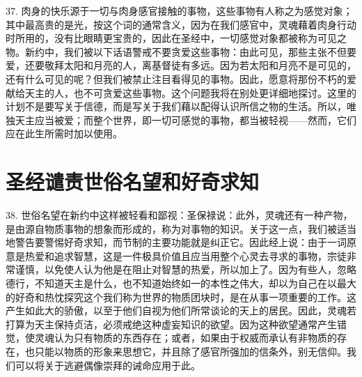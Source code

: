 37. 肉身的快乐源于一切与肉身感官接触的事物，这些事物有人称之为感觉对象；其中最高贵的是光，按这个词的通常含义，因为在我们感官中，灵魂藉着肉身行动时所用的，没有比眼睛更宝贵的，因此在圣经中，一切感觉对象都被称为可见之物。新约中，我们被以下话语警戒不要贪爱这些事物：由此可见，那些主张不但要爱，还要敬拜太阳和月亮的人，离基督徒有多远。因为若太阳和月亮不是可见的，还有什么可见的呢？但我们被禁止注目看得见的事物。因此，愿意将那份不朽的爱献给天主的人，也不可贪爱这些事物。这个问题我将在别处更详细地探讨。这里的计划不是要写关于信德，而是写关于我们藉以配得认识所信之物的生活。所以，唯独天主应当被爱；而整个世界，即一切可感觉的事物，都当被轻视——然而，它们应在此生所需时加以使用。\par


\section{圣经谴责世俗名望和好奇求知}

38. 世俗名望在新约中这样被轻看和鄙视：圣保禄说：此外，灵魂还有一种产物，是由源自物质事物的想象而形成的，称为对事物的知识。关于这一点，我们被适当地警告要警惕好奇求知，而节制的主要功能就是纠正它。因此经上说：由于一词原意是热爱和追求智慧，这是一件极具价值且应当用整个心灵去寻求的事物，宗徒非常谨慎，以免使人认为他是在阻止对智慧的热爱，所以加上了。因为有些人，忽略德行，不知道天主是什么，也不知道始终如一的本性之伟大，却以为自己在以最大的好奇和热忱探究这个我们称为世界的物质团块时，是在从事一项重要的工作。这产生如此大的骄傲，以至于他们自视为他们所常谈论的天上的居民。因此，灵魂若打算为天主保持贞洁，必须戒绝这种虚妄知识的欲望。因为这种欲望通常产生错觉，使灵魂认为只有物质的东西存在；或者，如果由于权威而承认有非物质的存在，也只能以物质的形象来思想它，并且除了感官所强加的信条外，别无信仰。我们可以将关于逃避偶像崇拜的诫命应用于此。\par

